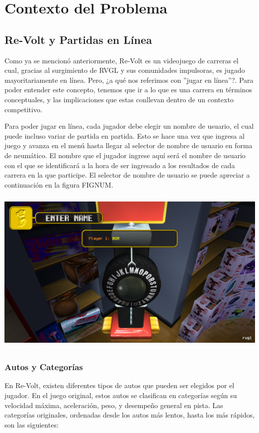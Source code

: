 \section{Contexto del Problema}

\subsection{Re-Volt y Partidas en Línea}
Como ya se mencionó anteriormente, Re-Volt es un videojuego de carreras el cual, gracias al surgimiento de RVGL y sus comunidades impulsoras, es jugado mayoritariamente en línea. Pero, ¿a qué nos referimos con ''jugar en línea''?. Para poder entender este concepto, tenemos que ir a lo que es una carrera en términos conceptuales, y las implicaciones que estas conllevan dentro de un contexto competitivo.

Para poder jugar en línea, cada jugador debe elegir un nombre de usuario, el cual puede incluso variar de partida en partida. Esto se hace una vez que ingresa al juego y avanza en el menú hasta llegar al selector de nombre de usuario en forma de neumático. El nombre que el jugador ingrese aquí será el nombre de usuario con el que se identificará a la hora de ser ingresado a los resultados de cada carrera en la que participe. El selector de nombre de usuario se puede apreciar a continuación en la figura FIGNUM.

\includegraphics[width=15cm, height=8cm]{img/username.png}

\subsubsection{Autos y Categorías}
En Re-Volt, existen diferentes tipos de autos que pueden ser elegidos por el jugador. En el juego original, estos autos se clasifican en categorías según su velocidad máxima, aceleración, peso, y desempeño general en pista. Las categorías originales, ordenadas desde los autos más lentos, hasta los más rápidos, son las siguientes:

